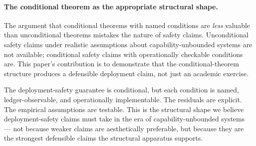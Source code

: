 \paragraph{The conditional theorem as the appropriate structural
shape.}
The argument that conditional theorems with named conditions are
\emph{less} valuable than unconditional theorems mistakes the
nature of safety claims. Unconditional safety claims under
realistic assumptions about capability-unbounded systems are not
available; conditional safety claims with operationally checkable
conditions are. This paper's contribution is to demonstrate that the
conditional-theorem structure produces a defensible deployment
claim, not just an academic exercise.

The deployment-safety guarantee is conditional, but each condition
is named, ledger-observable, and operationally implementable. The
residuals are explicit. The empirical assumptions are testable.
This is the structural shape we believe deployment-safety claims
must take in the era of capability-unbounded systems --- not because
weaker claims are aesthetically preferable, but because they are
the strongest defensible claims the structural apparatus supports.
